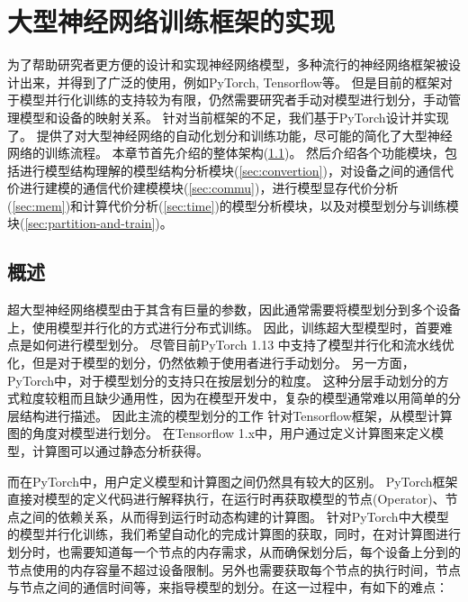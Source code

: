 \chapter{大型神经网络训练框架的实现}
\label{chapter:implementation}

为了帮助研究者更方便的设计和实现神经网络模型，多种流行的神经网络框架被设计出来，并得到了广泛的使用，例如PyTorch, Tensorflow等。
但是目前的框架对于模型并行化训练的支持较为有限，仍然需要研究者手动对模型进行划分，手动管理模型和设备的映射关系。
针对当前框架的不足，我们基于PyTorch设计并实现了\sys{}。
\sys{}提供了对大型神经网络的自动化划分和训练功能，尽可能的简化了大型神经网络的训练流程。
本章节首先介绍\sys{}的整体架构(\ref{sec:sys-overview})。
然后介绍各个功能模块，包括进行模型结构理解的模型结构分析模块(\ref{sec:convertion})，对设备之间的通信代价进行建模的通信代价建模模块(\ref{sec:commu})，进行模型显存代价分析(\ref{sec:mem})和计算代价分析(\ref{sec:time})的模型分析模块，以及对模型划分与训练模块(\ref{sec:partition-and-train})。

\section{\sys{}概述}
\label{sec:sys-overview}
超大型神经网络模型由于其含有巨量的参数，因此通常需要将模型划分到多个设备上，使用模型并行化的方式进行分布式训练。
因此，训练超大型模型时，首要难点是如何进行模型划分。
尽管目前PyTorch 1.13 中支持了模型并行化和流水线优化，但是对于模型的划分，仍然依赖于使用者进行手动划分。
另一方面，PyTorch中，对于模型划分的支持只在按层划分的粒度。
这种分层手动划分的方式粒度较粗而且缺少通用性，因为在模型开发中，复杂的模型通常难以用简单的分层结构进行描述。
因此主流的模型划分的工作 针对Tensorflow框架，从模型计算图的角度对模型进行划分。
在Tensorflow 1.x中，用户通过定义计算图来定义模型，计算图可以通过静态分析获得。

而在PyTorch中，用户定义模型和计算图之间仍然具有较大的区别。
PyTorch框架直接对模型的定义代码进行解释执行，在运行时再获取模型的节点(Operator)、节点之间的依赖关系，从而得到运行时动态构建的计算图。
针对PyTorch中大模型的模型并行化训练，我们希望自动化的完成计算图的获取，同时，在对计算图进行划分时，也需要知道每一个节点的内存需求，从而确保划分后，每个设备上分到的节点使用的内存容量不超过设备限制。另外也需要获取每个节点的执行时间，节点与节点之间的通信时间等，来指导模型的划分。在这一过程中，有如下的难点：

